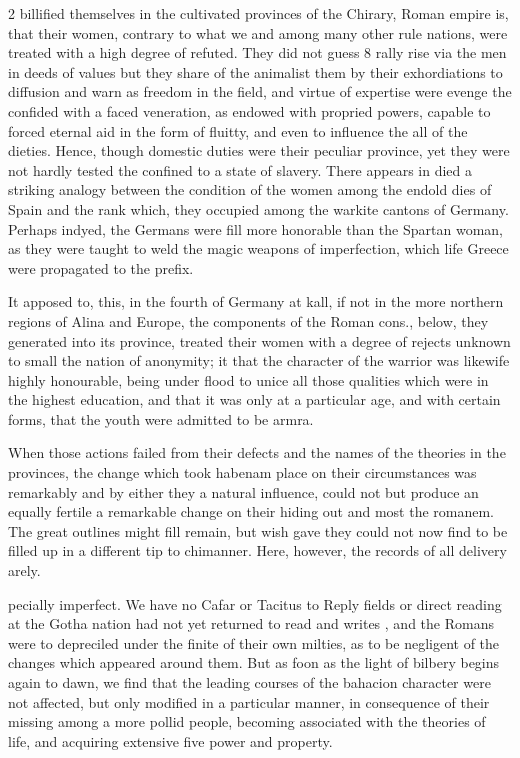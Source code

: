 \documentclass[10pt]{article}
\begin{document}
\begin{multicols}{2}
billified themselves in the cultivated provinces of the Chirary, Roman empire is, that their women, contrary to what we and among many other rule nations, were treated with a high degree of refuted. They did not guess 8 rally rise via the men in deeds of values but they share of the animalist them by their exhordiations to diffusion and warn as freedom in the field, and virtue of expertise were evenge the confided with a faced veneration, as endowed with propried powers, capable to forced eternal aid in the form of fluitty, and even to influence the all of the dieties. Hence, though domestic duties were their peculiar province, yet they were not hardly tested the confined to a state of slavery. There appears in died a striking analogy between the condition of the women among the endold dies of Spain and the rank which, they occupied among the warkite cantons of Germany. Perhaps indyed, the Germans were fill more honorable than the Spartan woman, as they were taught to weld the magic weapons of imperfection, which life Greece were propagated to the prefix.

It apposed to, this, in the fourth of Germany at kall, if not in the more northern regions of Alina and Europe, the components of the Roman cons., below, they generated into its province, treated their women with a degree of rejects unknown to small the nation of anonymity; it that the character of the warrior was likewife highly honourable, being under flood to unice all those qualities which were in the highest education, and that it was only at a particular age, and with certain forms, that the youth were admitted to be armra.

When those actions failed from their defects and the names of the theories in the provinces, the change which took habenam place on their circumstances was remarkably and by either they a natural influence, could not but produce an equally fertile a remarkable change on their hiding out and most the romanem. The great outlines might fill remain, but wish gave they could not now find to be filled up in a different tip to chimanner. Here, however, the records of all delivery arely.

pecially imperfect. We have no Cafar or Tacitus to Reply fields or direct reading at the Gotha nation had not yet returned to read and writes , and the Romans were to depreciled under the finite of their own milties, as to be negligent of the changes which appeared around them. But as foon as the light of bilbery begins again to dawn, we find that the leading courses of the bahacion character were not affected, but only modified in a particular manner, in consequence of their missing among a more pollid people, becoming associated with the theories of life, and acquiring extensive five power and property.


\end{multicols}
\end{document}
